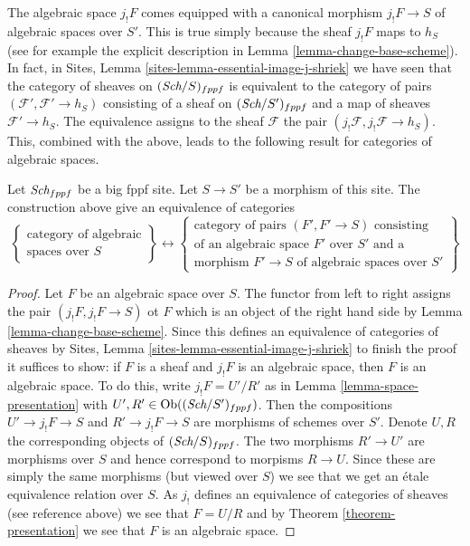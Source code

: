 \noindent
The algebraic space $j_!F$ comes equipped with a canonical morphism
$j_!F \to S$ of algebraic spaces over $S'$. This is true simply
because the sheaf $j_!F$ maps to $h_S$ (see for example the
explicit description in
Lemma \ref{lemma-change-base-scheme}).
In fact, in
Sites, Lemma \ref{sites-lemma-essential-image-j-shriek}
we have seen that the category of sheaves on $(\textit{Sch}/S)_{fppf}$
is equivalent to the category of pairs $(\mathcal{F}', \mathcal{F}' \to h_S)$
consisting of a sheaf on $(\textit{Sch}/S')_{fppf}$ and a map of sheaves
$\mathcal{F}' \to h_S$. The equivalence assigns to the sheaf $\mathcal{F}$
the pair $(j_!\mathcal{F}, j_!\mathcal{F} \to h_S)$.
This, combined with the above, leads to the following
result for categories of algebraic spaces.

\begin{lemma}
\label{lemma-category-of-spaces-over-smaller-base-scheme}
Let $\textit{Sch}_{fppf}$ be a big fppf site.
Let $S \to S'$ be a morphism of this site.
The construction above give an equivalence of
categories
$$
\left\{
\begin{matrix}
\text{category of algebraic}\\
\text{spaces over }S
\end{matrix}
\right\}
\leftrightarrow
\left\{
\begin{matrix}
\text{category of pairs }(F', F' \to S)\text{ consisting}\\
\text{of an algebraic space }F'\text{ over }S'\text{ and a}\\
\text{morphism }F' \to S\text{ of algebraic spaces over }S'
\end{matrix}
\right\}
$$
\end{lemma}

\begin{proof}
Let $F$ be an algebraic space over $S$. The functor from left to right
assigns the pair $(j_!F, j_!F \to S)$ ot $F$
which is an object of the right hand side by
Lemma \ref{lemma-change-base-scheme}.
Since this defines an equivalence of categories of sheaves by
Sites, Lemma \ref{sites-lemma-essential-image-j-shriek}
to finish the proof it suffices to show:
if $F$ is a sheaf and $j_!F$ is an algebraic space, then $F$
is an algebraic space. To do this, write
$j_!F = U'/R'$ as in
Lemma \ref{lemma-space-presentation}
with $U', R' \in \mathop{\rm Ob}\nolimits((\textit{Sch}/S')_{fppf})$.
Then the compositions $U' \to j_!F \to S$ and $R' \to j_!F \to S$
are morphisms of schemes over $S'$. Denote $U, R$ the corresponding
objects of $(\textit{Sch}/S)_{fppf}$. The two morphisms
$R' \to U'$ are morphisms over $S$ and hence correspond to
morpisms $R \to U$. Since these are simply the same
morphisms (but viewed over $S$) we see that we get an \'etale
equivalence relation over $S$. As $j_!$ defines an equivalence of
categories of sheaves (see reference above) we see that
$F = U/R$ and by
Theorem \ref{theorem-presentation}
we see that $F$ is an algebraic space.
\end{proof}

